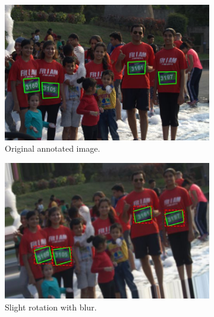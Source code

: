 \begin{figure}[h!]
  \centering
  \hspace{\fill}
  \begin{subfigure}[b]{0.475\textwidth}
    \includegraphics[width=\textwidth]{images/dataset/augmentation/original}
    \caption{Original annotated image.}
  \end{subfigure}
  \hspace{\fill}
  \begin{subfigure}[b]{0.475\textwidth}
    \includegraphics[width=\textwidth]{images/dataset/augmentation/slight_rotate_blur}
    \caption{Slight rotation with blur.}
  \end{subfigure}
  \hspace{\fill}
  \bigskip
  \\
  \hspace{\fill}
  \begin{subfigure}[b]{0.475\textwidth}

\end{subfigure}
\end{figure}

